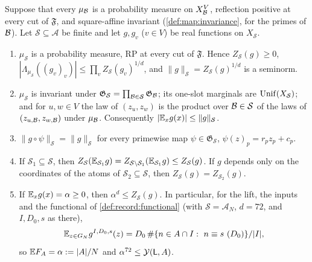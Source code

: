 \begin{lemma}\label{lem:record:holder}
Suppose that every $\mu_\mathcal B$ is a probability measure on $X_\mathcal B^V$, reflection
positive at every cut of $\mathfrak F$, and square-affine invariant
(\cref{def:map:invariance}, for the primes of $\mathcal B$). Let
$\mathcal S\subseteq\mathcal A$ be finite and let $g,g_v$ ($v\in V$) be real
functions on $X_{\mathcal S}$.
\begin{enumerate}[label=(\alph*)]
\item $\mu_{\mathcal S}$ is a probability measure, RP at every cut of
 $\mathfrak F$. Hence $Z_{\mathcal S}(g)\ge0$,
 $|\Lambda_{\mu_{\mathcal S}}((g_v)_v)|\le\prod_vZ_{\mathcal S}(g_v)^{1/d}$, and
 $\|g\|_{\mathcal S}=Z_{\mathcal S}(g)^{1/d}$ is a seminorm.
\item $\mu_{\mathcal S}$ is invariant under
 $\mathfrak G_{\mathcal S}=\prod_{\mathcal B\in\mathcal S}\mathfrak G_\mathcal B$; its one-slot
 marginals are $\operatorname{Unif}(X_{\mathcal S})$; and for $u,w\in V$ the law of
 $(z_u,z_w)$ is the product over $\mathcal B\in\mathcal S$ of the laws of
 $(z_{u,\mathcal B},z_{w,\mathcal B})$ under $\mu_\mathcal B$. Consequently
 $|\mathbb E_xg(x)|\le\|g\|_{\mathcal S}$.
\item $\|g\circ\psi\|_{\mathcal S}=\|g\|_{\mathcal S}$ for every primewise map
 $\psi\in\mathfrak G_{\mathcal S}$, $\psi(z)_p=r_pz_p+c_p$.
\item If $\mathcal S_1\subseteq\mathcal S$, then
 $Z_{\mathcal S}(\mathbb E_{\mathcal S_1}g)=Z_{\mathcal S\setminus\mathcal S_1}(\mathbb E_{\mathcal S_1}g)
 \le Z_{\mathcal S}(g)$. If $g$ depends only on the coordinates of the atoms of
 $\mathcal S_2\subseteq\mathcal S$, then $Z_{\mathcal S}(g)=Z_{\mathcal S_2}(g)$.
\item If $\mathbb E_xg(x)=\alpha\ge0$, then $\alpha^d\le Z_{\mathcal S}(g)$. In
 particular, for the lift, the inputs and the functional of
 \cref{def:record:functional} (with $\mathcal S=\mathcal A_N$, $d=72$, and $I,D_0,s$ as there),
 \[
  \E_{z\in G_N}g^{I,D_0,s}(z)=\frac{D_0\,\#\{n\in A\cap I:\ n\equiv s\ (D_0)\}}{|I|},
 \]
 so $\mathbb E F_A=\alpha:=|A|/N$ and $\alpha^{72}\le\mathcal Y(\mathsf L,A)$.
\end{enumerate}
\end{lemma}

